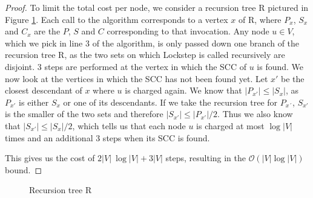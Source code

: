 \documentclass[../master/master.tex]{subfiles}
\begin{document}
\begin{proof}
  To limit the total cost per node, we consider a recursion tree R pictured in Figure \ref{R}. Each call to the algorithm corresponds to a vertex $x$ of R, where $P_x$, $S_x$ and $C_x$ are the $P$, $S$ and $C$ corresponding to that invocation. Any node $u \in V$, which we pick in line 3 of the algorithm, is only passed down one branch of the recursion tree R, as the two sets on which Lockstep is called recursively are disjoint. 3 steps are performed at the vertex in which the SCC of $u$ is found. We now look at the vertices in which the SCC has not been found yet. Let $x'$ be the closest descendant of $x$ where $u$ is charged again. We know that $|P_{x'}|\leq |S_x|$, as $P_{x'}$ is either $S_x$ or one of its descendants. If we take the recursion tree for $P_{x´}$, $S_{x'}$ is the smaller of the two sets and therefore $|S_{x'}|\leq |P_{x'}|/2$. Thus we also know that $|S_{x'}|\leq |S_{x}|/2$, which tells us that each node $u$ is charged at most $\log |V|$ times and an additional 3 steps when its SCC is found.

  This gives us the cost of $2|V|\ \log |V| + 3|V|$ steps, resulting in the $\mathcal{O}(|V|\log |V|)$ bound.
\end{proof}
\begin{figure}
  \centering
{}
\caption{Recursion tree R}
\label{R}
\end{figure}
\end{document}
